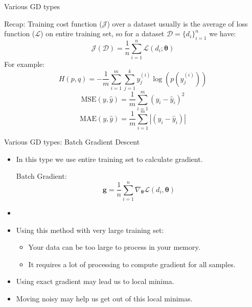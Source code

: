 \documentclass[compress,oilve,t]{beamer}
\newcommand{\tc}[2]{
	\textcolor{#1}{\hspace{-2pt}#2\hspace{-2pt}}
}
\begin{document}
\begin{frame}{Various GD types}
	\begin{block}{Recap:}
		Training cost function ($\mathcal{J}$) over a dataset usually is the average of loss function ($\mathcal{L}$) on entire training set, so for a dataset $\mathcal{D}=\{d_i\}_{i=1}^n$ we have:
		\[
		\mathcal{J}(\mathcal{D}) = \frac{1}{n} \sum_{i=1}^{n} \mathcal{L}(d_i; \bm{\theta})
		\]
		For example:
		\begin{equation*}
			H(p, q)=-\frac{1}{m} \sum_{i=1}^m\sum_{j=1}^{k} y_j^{(i)} \log (p(y_j^{(i)}))
		\end{equation*}
		\begin{equation*}
			\text{MSE}(y, \hat{y}) = \frac{1}{m}\sum_{i=1}^{m}(y_i-\hat{y}_i)^2
		\end{equation*}
		\begin{equation*}
			\text{MAE}(y, \hat{y}) = \frac{1}{m}\sum_{i=1}^{m}|(y_i-\hat{y}_i)|
		\end{equation*}
	\end{block}
\end{frame}

\begin{frame}{Various GD types: Batch Gradient Descent}
	\begin{itemize}
		\item In this type we use \tc{keywords}{entire training set} to calculate gradient.
		\begin{block}{Batch Gradient:}
			\[
			\bm{g} = \frac{1}{n}\sum_{i=1}^n \nabla_{\bm{\theta}} \mathcal{L}(d_i, \bm{\theta})
			\]
		\end{block}
		\item[]
		\item Using this method with very large training set:
		\begin{itemize}
			\item Your data can be too large to process in your memory.
			\item It requires a lot of processing to compute gradient for all samples.
		\end{itemize}
		\item Using exact gradient may lead us to local minima.
		\item Moving noisy may help us get out of this local minimas.
	\end{itemize}
\end{frame}
\end{document}
